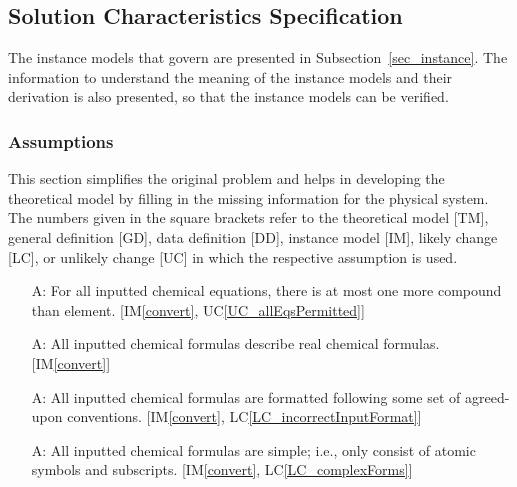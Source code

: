 \documentclass[12pt]{article}
\newcounter{assumpnum} %
\newcommand{\iref}[1]{IM\ref{#1}}
\newcommand{\lcref}[1]{LC\ref{#1}}
\newcommand{\ucref}[1]{UC\ref{#1}}
\begin{document}
\subsection{Solution Characteristics Specification}

%
%

The instance models that govern \progname{} are presented in
Subsection~\ref{sec_instance}.  The information to understand the meaning of the
instance models and their derivation is also presented, so that the instance
models can be verified.

\subsubsection{Assumptions} \label{sec_assumps}

This section simplifies the original problem and helps in developing the
theoretical model by filling in the missing information for the physical
system. The numbers given in the square brackets refer to the theoretical model
  [TM], general definition [GD], data definition [DD], instance model [IM],
likely change [LC], or unlikely change [UC] in which the respective assumption
is used.

\begin{itemize}

  \item[A\refstepcounter{assumpnum}\theassumpnum \label{A_elemCompDiff}:]
    For all inputted chemical equations, there is at most one more compound than
    element. 
    [\iref{convert}, \ucref{UC_allEqsPermitted}]

  \item[A\refstepcounter{assumpnum}\theassumpnum \label{A_validInput}:]
    All inputted chemical formulas describe real chemical formulas.
      [\iref{convert}]

  \item[A\refstepcounter{assumpnum}\theassumpnum \label{A_correctInputFormat}:]
    All inputted chemical formulas are formatted following some set of
    agreed-upon conventions.	[\iref{convert}, \lcref{LC_incorrectInputFormat}]

  \item[A\refstepcounter{assumpnum}\theassumpnum \label{A_simpleForms}:]
    All inputted chemical formulas are simple; i.e., only consist of atomic symbols
    and subscripts.	[\iref{convert}, \lcref{LC_complexForms}]

\end{itemize}
\end{document}
